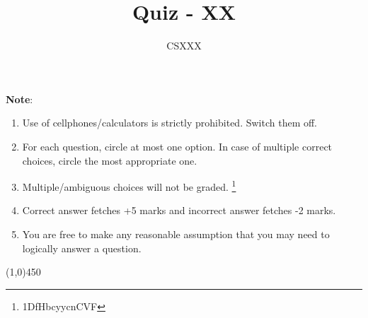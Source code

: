 \documentclass[10pt, letterpaper]{article}
\begin{document}
\title{Quiz - XX}
\author{CSXXX}
\date{}

\maketitle
\vspace{-0.25in}


\textbf{Note}:
\begin{enumerate}
\item Use of cellphones/calculators is strictly prohibited. Switch them off.  
\item For each question, circle at most one option. In case of multiple correct choices, circle the most appropriate one.
\item Multiple/ambiguous choices will not be graded. {\let\thefootnote\relax\footnote{1DfHbcyycnCVF}}
\item Correct answer fetches +5 marks and incorrect answer fetches -2 marks.
\item You are free to make any reasonable assumption that you may need to logically answer a question.
\end{enumerate}
\vspace{-0.25in}
\begin{center}
\line(1,0){450}
\end{center}
\end{document}
